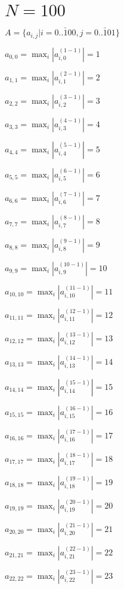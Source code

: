 \documentclass[a4paper,12pt]{article}
\begin{document}
\section{ $N = 100$ }
$A = \{ a _{ i, j } | i = \bar { 0..100 }, j = \bar { 0..101 } \}$

$a _{ 0, 0 } =  \max _i |a _{ i, 0 } ^{ (1 - 1) } | = 1$

$a _{ 1, 1 } =  \max _i |a _{ i, 1 } ^{ (2 - 1) } | = 2$

$a _{ 2, 2 } =  \max _i |a _{ i, 2 } ^{ (3 - 1) } | = 3$

$a _{ 3, 3 } =  \max _i |a _{ i, 3 } ^{ (4 - 1) } | = 4$

$a _{ 4, 4 } =  \max _i |a _{ i, 4 } ^{ (5 - 1) } | = 5$

$a _{ 5, 5 } =  \max _i |a _{ i, 5 } ^{ (6 - 1) } | = 6$

$a _{ 6, 6 } =  \max _i |a _{ i, 6 } ^{ (7 - 1) } | = 7$

$a _{ 7, 7 } =  \max _i |a _{ i, 7 } ^{ (8 - 1) } | = 8$

$a _{ 8, 8 } =  \max _i |a _{ i, 8 } ^{ (9 - 1) } | = 9$

$a _{ 9, 9 } =  \max _i |a _{ i, 9 } ^{ (10 - 1) } | = 10$

$a _{ 10, 10 } =  \max _i |a _{ i, 10 } ^{ (11 - 1) } | = 11$

$a _{ 11, 11 } =  \max _i |a _{ i, 11 } ^{ (12 - 1) } | = 12$

$a _{ 12, 12 } =  \max _i |a _{ i, 12 } ^{ (13 - 1) } | = 13$

$a _{ 13, 13 } =  \max _i |a _{ i, 13 } ^{ (14 - 1) } | = 14$

$a _{ 14, 14 } =  \max _i |a _{ i, 14 } ^{ (15 - 1) } | = 15$

$a _{ 15, 15 } =  \max _i |a _{ i, 15 } ^{ (16 - 1) } | = 16$

$a _{ 16, 16 } =  \max _i |a _{ i, 16 } ^{ (17 - 1) } | = 17$

$a _{ 17, 17 } =  \max _i |a _{ i, 17 } ^{ (18 - 1) } | = 18$

$a _{ 18, 18 } =  \max _i |a _{ i, 18 } ^{ (19 - 1) } | = 19$

$a _{ 19, 19 } =  \max _i |a _{ i, 19 } ^{ (20 - 1) } | = 20$

$a _{ 20, 20 } =  \max _i |a _{ i, 20 } ^{ (21 - 1) } | = 21$

$a _{ 21, 21 } =  \max _i |a _{ i, 21 } ^{ (22 - 1) } | = 22$

$a _{ 22, 22 } =  \max _i |a _{ i, 22 } ^{ (23 - 1) } | = 23$
\end{document}

